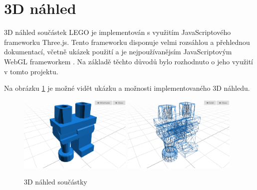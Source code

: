 \section{3D náhled}
3D náhled součástek LEGO je implementován s využitím JavaScriptového frameworku Three.js. Tento frameworku disponuje velmi rozsáhlou a přehlednou dokumentací, včetně ukázek použití a je nejpoužívanějsím JavaScriptovým WebGL frameworkem \autocite{webgl-comparison}. Na základě těchto důvodů bylo rozhodnuto o jeho využití v tomto projektu.





Na obrázku \ref{obrazek-ldraw-shortcut} je možné vidět ukázku a možnosti implementovaného 3D náhledu.

\begin{figure}[htbp]
        \centering
        \includegraphics[width=0.48\textwidth,height=\textheight,keepaspectratio]{images/model-viewer-solid.png}
        \includegraphics[width=0.48\textwidth,height=\textheight,keepaspectratio]{images/model-viewer-wireframe.png}
        \caption{3D náhled součástky \label{obrazek-ldraw-shortcut}}
\end{figure}